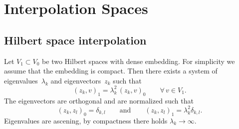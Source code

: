 








% 
\section{Interpolation Spaces}

\subsection{Hilbert space interpolation}
Let $V_1 \subset V_0$ be two Hilbert spaces with dense embedding. For simplicity we assume that the embedding is compact. Then there exists a system of eigenvalues~$\lambda_k$ and eigenvectors~$z_k$ such that
$$
(z_k, v)_1 = \lambda_k^2 \, (z_k, v)_0 \qquad \forall \, v \in V_1.
$$
The eigenvectors are orthogonal and are normalized such that
$$
(z_k,z_l)_0 = \delta_{k,l} \qquad \text{and} \qquad (z_k,z_l)_1 = \lambda_k^2 \delta_{k,l}.
$$
Eigenvalues are ascening, by compactness there holds $\lambda_k \rightarrow \infty$.



